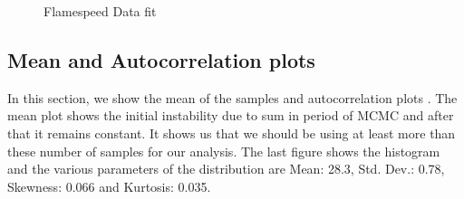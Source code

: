  \begin{figure}[H]
  \ContinuedFloat
  \centering
  \caption{Flamespeed Data fit}
\end{figure}



\subsection{Mean and Autocorrelation plots}

 In this section, we show the mean of the samples and autocorrelation plots . The mean plot shows the initial instability due to sum in period of MCMC and after that it remains constant. It shows us that we should be using at least more than these number of samples for our analysis. The last figure shows the histogram and the various parameters of the distribution are Mean:  28.3, Std. Dev.:  0.78, Skewness:  0.066 and Kurtosis:  0.035.


